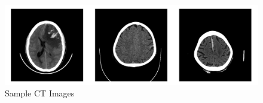 \begin{figure}
    \centerline{\includegraphics[width=1\columnwidth]{02-related-works/figures/sample-ct-images.png}}
    \caption{Sample CT Images \cite{chilamkurthy2018deep}}
    \label{fig:sample-ct-images}
\end{figure}